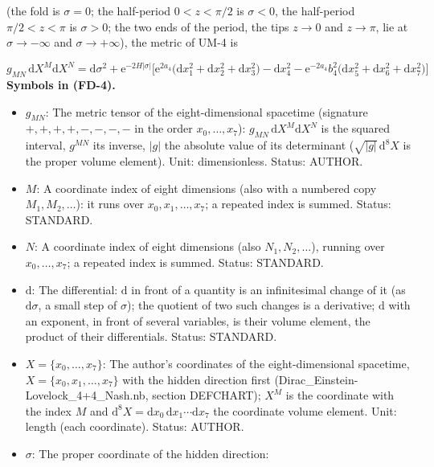 \documentclass[
  10pt,
]{article}
\providecommand{\tightlist}{%
  \setlength{\itemsep}{0pt}\setlength{\parskip}{0pt}}
\begin{document}
(the fold is \(\sigma = 0\); the half-period \(0 < z < \pi/2\) is
\(\sigma < 0\), the half-period \(\pi/2 < z < \pi\) is \(\sigma > 0\);
the two ends of the period, the tips \(z \to 0\) and \(z \to \pi\), lie
at \(\sigma \to -\infty\) and \(\sigma \to +\infty\)), the metric of
UM-4 is

\[
g_{MN}\,\mathrm{d}X^M\mathrm{d}X^N = \mathrm{d}\sigma^2 + \mathrm{e}^{-2H\lvert\sigma\rvert}\Big[\mathrm{e}^{2a_4}\big(\mathrm{d}x_1^2
 + \mathrm{d}x_2^2 + \mathrm{d}x_3^2\big) - \mathrm{d}x_4^2 - \mathrm{e}^{-2a_4}b_4^2\big(\mathrm{d}x_5^2 + \mathrm{d}x_6^2 + \mathrm{d}x_7^2\big)\Big] \tag{FD-4}
\] \textbf{Symbols in (FD-4).}

\begin{itemize}
\tightlist
\item
  \(g_{MN}\): The metric tensor of the eight-dimensional spacetime
  (signature \(+,+,+,+,-,-,-,-\) in the order \(x_0, \dots, x_7\)):
  \(g_{MN}\,\mathrm{d}X^M\mathrm{d}X^N\) is the squared interval,
  \(g^{MN}\) its inverse, \(\lvert g\rvert\) the absolute value of its
  determinant (\(\sqrt{\lvert g\rvert}\,\mathrm{d}^8X\) is the proper
  volume element). Unit: dimensionless. Status: AUTHOR.
\item
  \(M\): A coordinate index of eight dimensions (also with a numbered
  copy \(M_1, M_2, \dots\)): it runs over \(x_0, x_1, \dots, x_7\); a
  repeated index is summed. Status: STANDARD.
\item
  \(N\): A coordinate index of eight dimensions (also
  \(N_1, N_2, \dots\)), running over \(x_0, \dots, x_7\); a repeated
  index is summed. Status: STANDARD.
\item
  \(\mathrm{d}\): The differential: \(\mathrm{d}\) in front of a
  quantity is an infinitesimal change of it (as \(\mathrm{d}\sigma\), a
  small step of \(\sigma\)); the quotient of two such changes is a
  derivative; \(\mathrm{d}\) with an exponent, in front of several
  variables, is their volume element, the product of their
  differentials. Status: STANDARD.
\item
  \(X = \{x_0, \dots, x_7\}\): The author's coordinates of the
  eight-dimensional spacetime, \(X = \{x_0, x_1, \dots, x_7\}\) with the
  hidden direction first (Dirac\_Einstein-Lovelock\_4+4\_Nash.nb,
  section DEFCHART); \(X^M\) is the coordinate with the index \(M\) and
  \(\mathrm{d}^8X = \mathrm{d}x_0\,\mathrm{d}x_1\cdots\mathrm{d}x_7\)
  the coordinate volume element. Unit: length (each coordinate). Status:
  AUTHOR.
\item
  \(\sigma\): The proper coordinate of the hidden direction:

\end{itemize}
\end{document}
